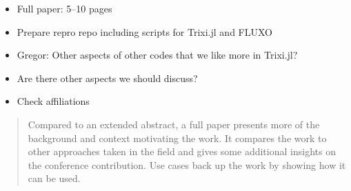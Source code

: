 \documentclass[hidelinks]{juliacon} %
\newcommand{\trixi}{Trixi.jl\xspace}
\newcommand{\todo}[1]{{\color{red}#1}}
\begin{document}



\todo{ %
\begin{itemize}
  \item Full paper: 5--10 pages
  \item Prepare repro repo including scripts for \trixi and FLUXO
  \item Gregor: Other aspects of other codes that we like more in \trixi?
  \item Are there other aspects we should discuss?
  \item Check affiliations
\end{itemize}
\begin{quote}
  Compared to an extended abstract, a full paper presents more of the background
  and context motivating the work. It compares the work to other approaches taken
  in the field and gives some additional insights on the conference contribution.
  Use cases back up the work by showing how it can be used.
\end{quote}}
\end{document}
